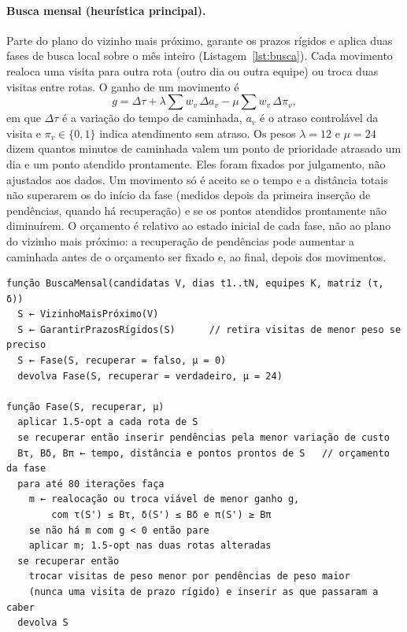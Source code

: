 \documentclass[11pt,a4paper]{article}
\begin{document}
\paragraph{Busca mensal (heurística principal).} Parte do plano do vizinho mais próximo, garante os prazos rígidos e aplica duas fases de busca local sobre o mês inteiro (Listagem~\ref{lst:busca}). Cada movimento realoca uma visita para outra rota (outro dia ou outra equipe) ou troca duas visitas entre rotas. O ganho de um movimento é
\begin{equation}
  g = \Delta\tau + \lambda \sum w_v\,\Delta a_v - \mu \sum w_v\,\Delta \pi_v,
\end{equation}
em que $\Delta\tau$ é a variação do tempo de caminhada, $a_v$ é o atraso controlável da visita e $\pi_v \in\{0,1\}$ indica atendimento sem atraso. Os pesos $\lambda = 12$ e $\mu = 24$ dizem quantos minutos de caminhada valem um ponto de prioridade atrasado um dia e um ponto atendido prontamente. Eles foram fixados por julgamento, não ajustados aos dados. Um movimento só é aceito se o tempo e a distância totais não superarem os do início da fase (medidos depois da primeira inserção de pendências, quando há recuperação) e se os pontos atendidos prontamente não diminuírem. O orçamento é relativo ao estado inicial de cada fase, não ao plano do vizinho mais próximo: a recuperação de pendências pode aumentar a caminhada antes de o orçamento ser fixado e, ao final, depois dos movimentos.

\begin{lstlisting}[language=pseudo, caption={Busca mensal (simplificada do código em \texttt{main-heuristic.ts}).}, label={lst:busca}, mathescape=true]
função BuscaMensal(candidatas V, dias t1..tN, equipes K, matriz (τ, δ))
  S ← VizinhoMaisPróximo(V)
  S ← GarantirPrazosRígidos(S)      // retira visitas de menor peso se preciso
  S ← Fase(S, recuperar = falso, μ = 0)
  devolva Fase(S, recuperar = verdadeiro, μ = 24)

função Fase(S, recuperar, μ)
  aplicar 1.5-opt a cada rota de S
  se recuperar então inserir pendências pela menor variação de custo
  Bτ, Bδ, Bπ ← tempo, distância e pontos prontos de S   // orçamento da fase
  para até 80 iterações faça
    m ← realocação ou troca viável de menor ganho g,
        com τ(S') ≤ Bτ, δ(S') ≤ Bδ e π(S') ≥ Bπ
    se não há m com g < 0 então pare
    aplicar m; 1.5-opt nas duas rotas alteradas
  se recuperar então
    trocar visitas de peso menor por pendências de peso maior
    (nunca uma visita de prazo rígido) e inserir as que passaram a caber
  devolva S
\end{lstlisting}
\end{document}
